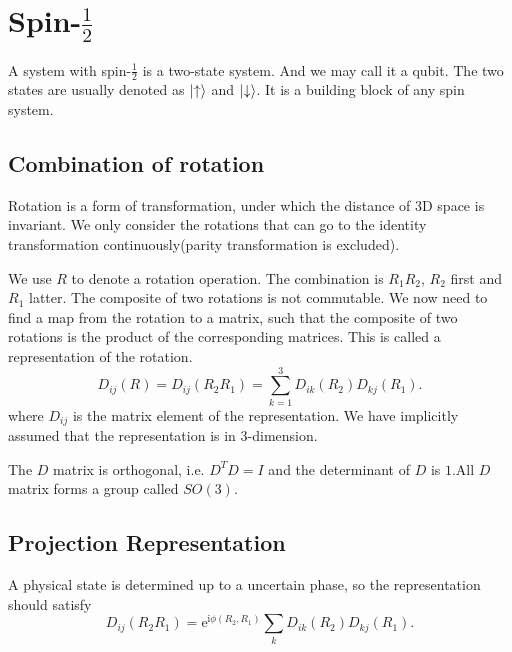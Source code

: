 
\chapter[自旋$\frac{1}{2}$粒子]{Spin-$\frac{1}{2}$}

A system with spin-$\frac{1}{2}$ is a two-state system. And we may call it a qubit. The two states are usually denoted as $\ket{\uparrow}$ and $\ket{\downarrow}$. It is a building block of any spin system. 

\section[旋转的复合]{Combination of rotation}
Rotation is a form of transformation, under which the distance of 3D space is invariant. We only consider the rotations that can go to the identity transformation continuously(parity transformation is excluded). 

We use $R$ to denote a rotation operation. The combination is $R_1 R_2$, $R_2$ first and $R_1$ latter. The composite of two rotations is not commutable. We now need to find a map from the rotation to a matrix, such that the composite of two rotations is the product of the corresponding matrices. This is called a representation of the rotation.
\begin{equation}
  D_{ij}\left( R \right)  = D_{ij}\left( R_2 R_1 \right) = \sum_{k=1}^{3} D_{ik}\left( R_2 \right) D_{kj}\left( R_1 \right).
\end{equation}
where $D_{ij}$ is the matrix element of the representation. We have implicitly assumed that the representation is in 3-dimension.

The $D$ matrix is orthogonal, i.e. $D^T D = I$ and the determinant of $D$ is $1$.All $D$ matrix forms a group called $SO\left( 3 \right) $.


\section[投影表示]{Projection Representation}
A physical state is determined up to a uncertain phase, so the representation should satisfy
\begin{equation}
  D_{ij}\left( R_2R_1 \right) = \mathrm{e}^{\mathrm{i} \phi\left( R_2,R_1 \right) } \sum_{k} D_{ik}\left( R_2 \right) D_{kj} \left( R_1 \right) .
\end{equation}